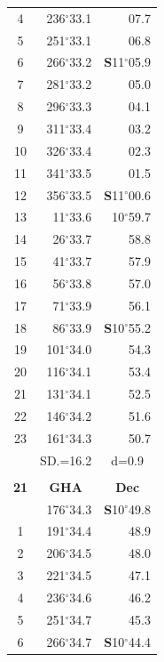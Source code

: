 \documentclass[10pt, a4paper]{report}
\begin{document}
\begin{scriptsize}
\begin{tabular*}{0.2\textwidth}[t]{@{\extracolsep{\fill}}|c|rr|}
4 & 236$^\circ$33.1 & 07.7\\
5 & 251$^\circ$33.1 & 06.8\\[2Pt]
6 & 266$^\circ$33.2 & \textbf{S}11$^\circ$05.9\\
7 & 281$^\circ$33.2 & 05.0\\
8 & 296$^\circ$33.3 & 04.1\\
9 & 311$^\circ$33.4 & \raisebox{0.24ex}{\boldmath$\cdot$~\boldmath$\cdot$~~}03.2\\
10 & 326$^\circ$33.4 & 02.3\\
11 & 341$^\circ$33.5 & 01.5\\[2Pt]
12 & 356$^\circ$33.5 & \textbf{S}11$^\circ$00.6\\
13 & 11$^\circ$33.6 & 10$^\circ$59.7\\
14 & 26$^\circ$33.7 & 58.8\\
15 & 41$^\circ$33.7 & \raisebox{0.24ex}{\boldmath$\cdot$~\boldmath$\cdot$~~}57.9\\
16 & 56$^\circ$33.8 & 57.0\\
17 & 71$^\circ$33.9 & 56.1\\[2Pt]
18 & 86$^\circ$33.9 & \textbf{S}10$^\circ$55.2\\
19 & 101$^\circ$34.0 & 54.3\\
20 & 116$^\circ$34.1 & 53.4\\
21 & 131$^\circ$34.1 & \raisebox{0.24ex}{\boldmath$\cdot$~\boldmath$\cdot$~~}52.5\\
22 & 146$^\circ$34.2 & 51.6\\
23 & 161$^\circ$34.3 & 50.7\\
\hline
\rule{0pt}{2.4ex} & \multicolumn{1}{c}{SD.=16.2} & \multicolumn{1}{c|}{d=0.9}\\
\hline
\multicolumn{1}{c}{}\\[-0.5ex]\hline
\multicolumn{1}{|c|}{\rule{0pt}{2.6ex}\textbf{21}} & \multicolumn{1}{c}{\textbf{GHA}} & \multicolumn{1}{c|}{\textbf{Dec}}\\
\hline\rule{0pt}{2.6ex}\noindent
0 & 176$^\circ$34.3 & \textbf{S}10$^\circ$49.8\\
1 & 191$^\circ$34.4 & 48.9\\
2 & 206$^\circ$34.5 & 48.0\\
3 & 221$^\circ$34.5 & \raisebox{0.24ex}{\boldmath$\cdot$~\boldmath$\cdot$~~}47.1\\
4 & 236$^\circ$34.6 & 46.2\\
5 & 251$^\circ$34.7 & 45.3\\[2Pt]
6 & 266$^\circ$34.7 & \textbf{S}10$^\circ$44.4\\

\end{tabular*}
\end{scriptsize}
\end{document}
